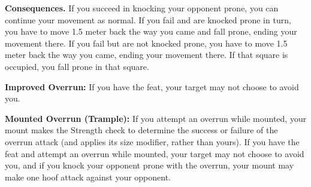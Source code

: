 \begin{enumerate*}
\item \textbf{Consequences.} If you succeed in knocking your opponent prone, you can continue your movement as normal. If you fail and are knocked prone in turn, you have to move 1.5 meter back the way you came and fall prone, ending your movement there. If you fail but are not knocked prone, you have to move 1.5 meter back the way you came, ending your movement there. If that square is occupied, you fall prone in that square.
\end{enumerate*}

\textbf{Improved Overrun:} If you have the  feat, your target may not choose to avoid you.

\textbf{Mounted Overrun (Trample):} If you attempt an overrun while mounted, your mount makes the Strength check to determine the success or failure of the overrun attack (and applies its size modifier, rather than yours). If you have the  feat and attempt an overrun while mounted, your target may not choose to avoid you, and if you knock your opponent prone with the overrun, your mount may make one hoof attack against your opponent.
